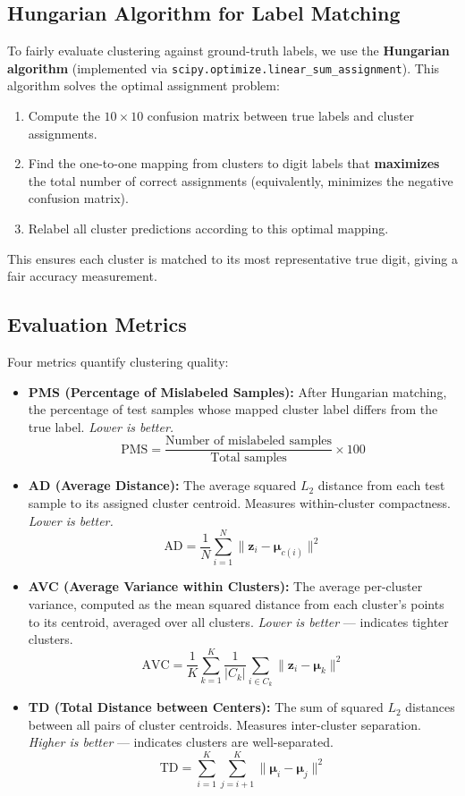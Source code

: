 \documentclass[12pt,a4paper]{article}
\begin{document}
\subsection{Hungarian Algorithm for Label Matching}
To fairly evaluate clustering against ground-truth labels, we use the \textbf{Hungarian algorithm} (implemented via \texttt{scipy.optimize.linear\_sum\_assignment}). This algorithm solves the optimal assignment problem:
\begin{enumerate}
    \item Compute the $10 \times 10$ confusion matrix between true labels and cluster assignments.
    \item Find the one-to-one mapping from clusters to digit labels that \textbf{maximizes} the total number of correct assignments (equivalently, minimizes the negative confusion matrix).
    \item Relabel all cluster predictions according to this optimal mapping.
\end{enumerate}
This ensures each cluster is matched to its most representative true digit, giving a fair accuracy measurement.

\subsection{Evaluation Metrics}
Four metrics quantify clustering quality:

\begin{itemize}
    \item \textbf{PMS (Percentage of Mislabeled Samples):} After Hungarian matching, the percentage of test samples whose mapped cluster label differs from the true label. \textit{Lower is better.}
    \[
    \text{PMS} = \frac{\text{Number of mislabeled samples}}{\text{Total samples}} \times 100
    \]
    \item \textbf{AD (Average Distance):} The average squared $L_2$ distance from each test sample to its assigned cluster centroid. Measures within-cluster compactness. \textit{Lower is better.}
    \[
    \text{AD} = \frac{1}{N} \sum_{i=1}^{N} \| \mathbf{z}_i - \boldsymbol{\mu}_{c(i)} \|^2
    \]
    \item \textbf{AVC (Average Variance within Clusters):} The average per-cluster variance, computed as the mean squared distance from each cluster's points to its centroid, averaged over all clusters. \textit{Lower is better} — indicates tighter clusters.
    \[
    \text{AVC} = \frac{1}{K} \sum_{k=1}^{K} \frac{1}{|C_k|} \sum_{i \in C_k} \| \mathbf{z}_i - \boldsymbol{\mu}_k \|^2
    \]
    \item \textbf{TD (Total Distance between Centers):} The sum of squared $L_2$ distances between all pairs of cluster centroids. Measures inter-cluster separation. \textit{Higher is better} — indicates clusters are well-separated.
    \[
    \text{TD} = \sum_{i=1}^{K} \sum_{j=i+1}^{K} \| \boldsymbol{\mu}_i - \boldsymbol{\mu}_j \|^2
    \]
\end{itemize}
\end{document}
